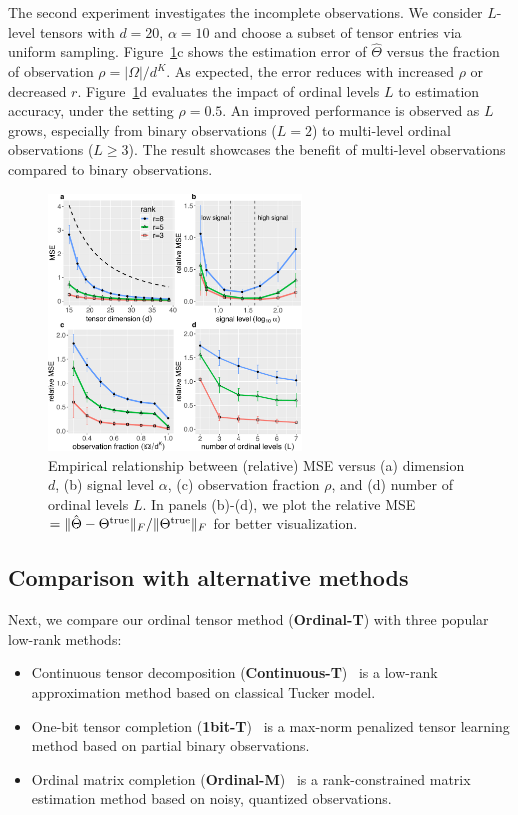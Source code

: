 \documentclass[11pt]{article}
\theoremstyle{plain}
\theoremstyle{definition}
\begin{document}
The second experiment investigates the incomplete observations. We consider $L$-level tensors with $d=20$, $\alpha=10$ and choose a subset of tensor entries via uniform sampling. Figure~\ref{fig:finite}c shows the estimation error of $\hat \Theta$ versus the fraction of observation $\rho=|\Omega|/d^K$. As expected, the error reduces with increased $\rho$ or decreased $r$. Figure~\ref{fig:finite}d evaluates the impact of ordinal levels $L$ to estimation accuracy, under the setting $\rho=0.5$. An improved performance is observed as $L$ grows, especially from binary observations ($L=2$) to multi-level ordinal observations ($L\geq 3$). The result showcases the benefit of multi-level observations compared to binary observations.

\begin{figure}[H]
  \centering
\includegraphics[width=0.6\textwidth]{panel.pdf}
\caption{Empirical relationship between (relative) MSE versus (a) dimension $d$, (b) signal level $\alpha$, (c) observation fraction $\rho$, and (d) number of ordinal levels $L$. In panels (b)-(d), we plot the relative MSE $=\lVert\hat \Theta-\Theta^{\mathrm{true}}\rVert_F/\lVert\Theta^{\mathrm{true}}\rVert_F$ for better visualization.}
\label{fig:finite}
\end{figure}

\subsection{Comparison with alternative methods}\label{sec:compare}
Next, we compare our ordinal tensor method ({\bf Ordinal-T}) with three popular low-rank methods:

\begin{itemize}
\item Continuous tensor decomposition ({\bf Continuous-T})~\cite{acar2010scalable} is a low-rank approximation method based on classical Tucker model.
\item One-bit tensor completion ({\bf 1bit-T})~\cite{ghadermarzy2018learning} is a max-norm penalized tensor learning method based on partial binary observations.
\item Ordinal matrix completion ({\bf Ordinal-M})~\cite{bhaskar2016probabilistic} is a rank-constrained matrix estimation method based on noisy, quantized observations.
\end{itemize}
\end{document}
